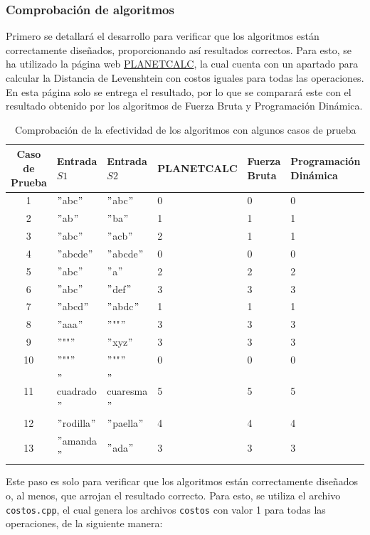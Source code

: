 \subsubsection{Comprobación de algoritmos}
Primero se detallará el desarrollo para verificar que los algoritmos están correctamente diseñados, proporcionando así resultados correctos. Para esto, se ha utilizado la página web \href{https://es.planetcalc.com/1721/}{PLANETCALC}, la cual cuenta con un apartado para calcular la Distancia de Levenshtein con costos iguales para todas las operaciones. En esta página solo se entrega el resultado, por lo que se comparará este con el resultado obtenido por los algoritmos de Fuerza Bruta y Programación Dinámica.

\begin{table}[H]
    \centering
    \footnotesize
    \begin{tabular}{|c|l|l|l|l|l|}
    \hline
    \textbf{Caso de Prueba} & \textbf{Entrada \( S1 \)} & \textbf{Entrada \( S2 \)} & \textbf{PLANETCALC} & \textbf{Fuerza Bruta} & \textbf{Programación Dinámica} \\
    \hline
    1 & $"$abc$"$ & $"$abc$"$ & 0 & 0 & 0 \\
    2 & $"$ab$"$ & $"$ba$"$ & 1 & 1 & 1 \\
    3 & $"$abc$"$ & $"$acb$"$ & 2 & 1 & 1 \\
    4 & $"$abcde$"$ & $"$abcde$"$ & 0 & 0 & 0 \\
    5 & $"$abc$"$ & $"$a$"$ & 2 & 2 & 2 \\
    6 & $"$abc$"$ & $"$def$"$ & 3 & 3 & 3 \\
    7 & $"$abcd$"$ & $"$abdc$"$ & 1 & 1 & 1 \\
    8 & $"$aaa$"$ & $"$""$"$ & 3 & 3 & 3 \\
    9 & $"$""$"$ & $"$xyz$"$ & 3 & 3 & 3 \\
    10 & $"$""$"$ & $"$""$"$ & 0 & 0 & 0 \\
    11 & $"$cuadrado$"$ & $"$cuaresma$"$ & 5 & 5 & 5 \\
    12 & $"$rodilla$"$ & $"$paella$"$ & 4 & 4 & 4 \\
    13 & $"$amanda$"$ & $"$ada$"$ & 3 & 3 & 3 \\
    \hline
    \end{tabular}
    \caption{Comprobación de la efectividad de los algoritmos con algunos casos de prueba}
    \label{fig:comparacion}
\end{table}

Este paso es solo para verificar que los algoritmos están correctamente diseñados o, al menos, que arrojan el resultado correcto. Para esto, se utiliza el archivo \texttt{costos.cpp}, el cual genera los archivos \texttt{costos} con valor 1 para todas las operaciones, de la siguiente manera:

